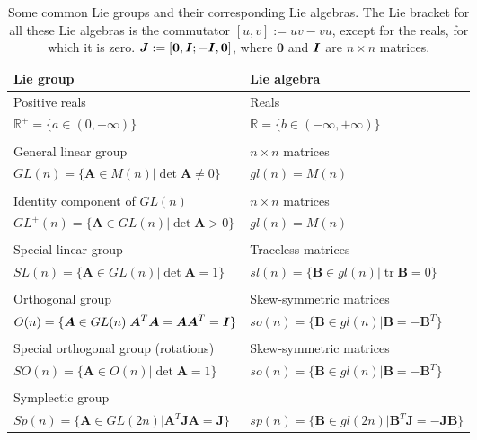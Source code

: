 \documentclass[12pt]{article}
\newcommand{\mbs}[1]{\boldsymbol{#1}}
\newcommand{\mbb}[1]{\mathbb{#1}}
\def\bA{{\mbs{A}}} \def\bB{{\mbs{B}}} \def\bC{{\mbs{C}}}
\def\bJ{{\mbs{J}}} \def\bK{{\mbs{K}}} \def\bL{{\mbs{L}}}
\DeclareMathOperator{\tr}{tr}
\begin{document}
\begin{table}[htbp]
  \begin{center}
    \begin{tabular}{ l l }
      \toprule
      Lie group
      &
      Lie algebra
      \\
      \hline
      Positive reals
      &
      Reals
      \\
      $\mbb{R}^+ = \{ a \in (0,+\infty) \}$
      &
      $\mbb{R} = \{ b \in (-\infty, +\infty) \}$
      \\
      \\
      General linear group
      &
      $n\times n$ matrices
      \\
      $GL(n)=\{\bA\in M(n) | \det \bA \neq 0\}$
      &
      $gl(n)=M(n)$
      \\
      \\
      Identity component of $GL(n)$
      &
      $n\times n$ matrices
      \\
      $GL^+(n)=\{\bA\in GL(n) | \det \bA > 0\}$
      &
      $gl(n)=M(n)$
      \\
      \\
      Special linear group
      &
      Traceless matrices
      \\
      $SL(n)=\{\bA\in GL(n) | \det \bA = 1\}$
      &
      $sl(n)=\{\bB\in gl(n) | \tr \bB = 0\}$
      \\
      \\
      Orthogonal group
      &
      Skew-symmetric matrices
      \\
      $O(n)=\{\bA\in GL(n) | \bA^T\bA = \bA\bA^T = \bI\}$
      &
      $so(n)=\{\bB\in gl(n) | \bB = -\bB^T\}$
      \\
      \\
      Special orthogonal group (rotations)
      &
      Skew-symmetric matrices
      \\
      $SO(n)=\{\bA\in O(n) | \det \bA=1\}$
      &
      $so(n)=\{\bB\in gl(n) | \bB = -\bB^T\}$
      \\
      \\
      Symplectic group
      &
      
      \\
      $Sp(n)=\{\bA\in GL(2n) | \bA^T \bJ\bA = \bJ\}$
      &
      $sp(n)=\{\bB\in gl(2n) | \bB^T \bJ = -\bJ \bB\}$
      \\
      \bottomrule
    \end{tabular}
    \caption{Some common Lie groups and their corresponding Lie
      algebras. The Lie bracket for all these Lie algebras is the
      commutator $[u,v] := uv - vu$, except for the reals, for which
      it is zero. $\bJ := [\mathbf{0}, \bI; -\bI, \mathbf{0}]$, where
      $\mathbf{0}$ and $\bI$ are $n \times n$ matrices.}
    \label{tab:LieGroupsLieAlgebras}
  \end{center}
\end{table}
\end{document}

